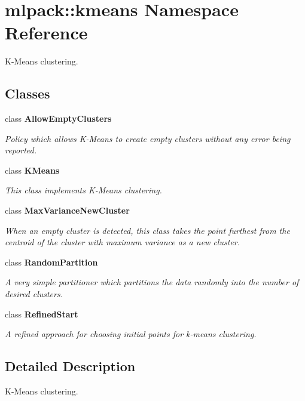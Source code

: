 \section{mlpack\-:\-:kmeans Namespace Reference}
\label{namespacemlpack_1_1kmeans}


K-\/\-Means clustering.  


\subsection*{Classes}
\begin{DoxyCompactItemize}
\item 
class {\bf Allow\-Empty\-Clusters}
\begin{DoxyCompactList}\small\item\em Policy which allows K-\/\-Means to create empty clusters without any error being reported. \end{DoxyCompactList}\item 
class {\bf K\-Means}
\begin{DoxyCompactList}\small\item\em This class implements K-\/\-Means clustering. \end{DoxyCompactList}\item 
class {\bf Max\-Variance\-New\-Cluster}
\begin{DoxyCompactList}\small\item\em When an empty cluster is detected, this class takes the point furthest from the centroid of the cluster with maximum variance as a new cluster. \end{DoxyCompactList}\item 
class {\bf Random\-Partition}
\begin{DoxyCompactList}\small\item\em A very simple partitioner which partitions the data randomly into the number of desired clusters. \end{DoxyCompactList}\item 
class {\bf Refined\-Start}
\begin{DoxyCompactList}\small\item\em A refined approach for choosing initial points for k-\/means clustering. \end{DoxyCompactList}\end{DoxyCompactItemize}


\subsection{Detailed Description}
K-\/\-Means clustering. 